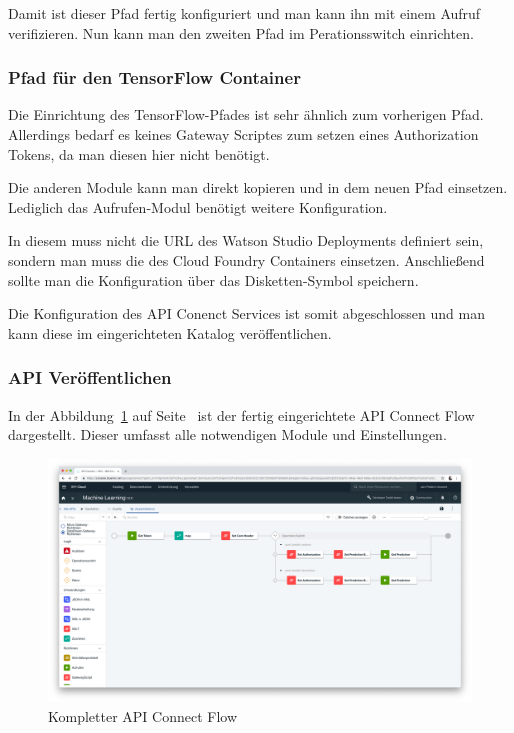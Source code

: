 Damit ist dieser Pfad fertig konfiguriert und man kann ihn mit einem Aufruf verifizieren. Nun kann man den zweiten Pfad
im Perationsswitch einrichten.

\subsubsection*{Pfad für den TensorFlow Container}
Die Einrichtung des TensorFlow-Pfades ist sehr ähnlich zum vorherigen Pfad. Allerdings bedarf es keines Gateway Scriptes
zum setzen eines Authorization Tokens, da man diesen hier nicht benötigt.

Die anderen Module kann man direkt kopieren und in dem neuen Pfad einsetzen. Lediglich das Aufrufen-Modul benötigt
weitere Konfiguration.

In diesem muss nicht die URL des Watson Studio Deployments definiert sein, sondern man muss die des Cloud
Foundry Containers einsetzen. Anschließend sollte man die Konfiguration über das Disketten-Symbol speichern.

Die Konfiguration des API Conenct Services ist somit abgeschlossen und man kann diese im eingerichteten Katalog
veröffentlichen.

\subsubsection{API Veröffentlichen}
In der Abbildung~\ref{fig:umsetzung_api_connect} auf Seite~\pageref{fig:umsetzung_api_connect} ist der fertig
eingerichtete API Connect Flow dargestellt. Dieser umfasst alle notwendigen Module und Einstellungen.

\begin{figure}[h]
    \centering
    \includegraphics[width=\textwidth]{images/kapitel_3/api_connect.png}
    \caption{Kompletter API Connect Flow}
    \label{fig:umsetzung_api_connect}
\end{figure}

